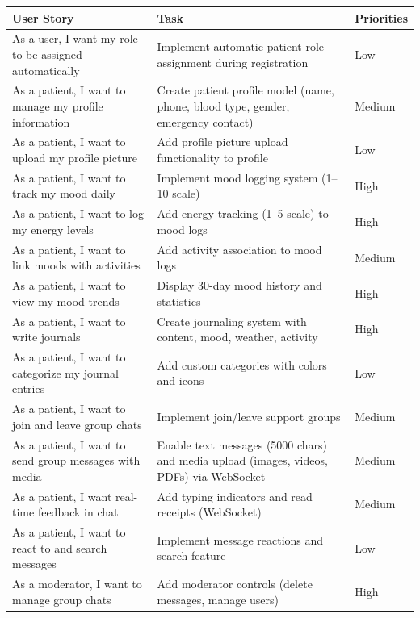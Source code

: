 \begin{table}[H] %
\centering
\begin{tabular}{|p{4.2cm}|p{7.2cm}|p{2.2cm}|}
\hline
\textbf{User Story} & \textbf{Task} & \textbf{Priorities} \\
\hline
As a user, I want my role to be assigned automatically & Implement automatic patient role assignment during registration & Low \\
\hline
As a patient, I want to manage my profile information & Create patient profile model (name, phone, blood type, gender, emergency contact) & Medium \\
\hline
As a patient, I want to upload my profile picture & Add profile picture upload functionality to profile & Low \\
\hline
As a patient, I want to track my mood daily & Implement mood logging system (1--10 scale) & High \\
\hline
As a patient, I want to log my energy levels & Add energy tracking (1--5 scale) to mood logs & High \\
\hline
As a patient, I want to link moods with activities & Add activity association to mood logs & Medium \\
\hline
As a patient, I want to view my mood trends & Display 30-day mood history and statistics & High \\
\hline
As a patient, I want to write journals & Create journaling system with content, mood, weather, activity & High \\
\hline
As a patient, I want to categorize my journal entries & Add custom categories with colors and icons & Low \\
\hline
As a patient, I want to join and leave group chats & Implement join/leave support groups & Medium \\
\hline
As a patient, I want to send group messages with media & Enable text messages (5000 chars) and media upload (images, videos, PDFs) via WebSocket & Medium \\
\hline
As a patient, I want real-time feedback in chat & Add typing indicators and read receipts (WebSocket) & Medium \\
\hline
As a patient, I want to react to and search messages & Implement message reactions and search feature & Low \\
\hline
As a moderator, I want to manage group chats & Add moderator controls (delete messages, manage users) & High \\
\hline

\end{tabular}
\end{table}
